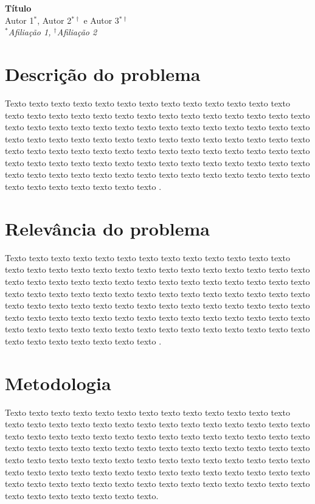 \documentclass[a4paper,10pt,twoside]{article}
\newcommand{\info}[3]{
  \pagebreak
  \begin{center}
    \vspace*{2ex}
    \textbf{\huge #1}\vspace*{2ex}\\
    {\large #2}\vspace*{2ex}\\
    \textit{#3}
    \vspace*{4ex}\\
    \end{center}
    }
\begin{document}
\info{Título}{Autor 1$^*$, Autor 2$^{*\dagger}$ e Autor 3$^{*\dagger}$}{$^{*}$Afiliação 1, $^{\dagger}$Afiliação 2}


\section{Descrição do problema}

Texto texto texto texto texto texto texto texto texto texto texto texto texto texto texto texto texto texto texto texto texto texto texto texto texto texto texto texto texto texto texto texto texto texto texto texto texto texto texto texto texto texto texto texto texto texto texto texto texto texto texto texto texto texto texto texto texto texto texto texto texto texto texto texto texto texto texto texto texto texto texto texto texto texto texto texto texto texto texto texto texto texto texto texto texto texto texto texto texto texto texto texto texto texto texto texto texto texto texto texto texto texto texto texto \citep{ref1,ref2}.

\section{Relevância do problema}

Texto texto texto texto texto texto texto texto texto texto texto texto texto texto texto texto texto texto texto texto texto texto texto texto texto texto texto texto texto texto texto texto texto texto texto texto texto texto texto texto texto texto texto texto texto texto texto texto texto texto texto texto texto texto texto texto texto texto texto texto texto texto texto texto texto texto texto texto texto texto texto texto texto texto texto texto texto texto texto texto texto texto texto texto texto texto texto texto texto texto texto texto texto texto texto texto texto texto texto texto texto texto texto texto \citep{ref3,ref4}.

\section{Metodologia}

Texto texto texto texto texto texto texto texto texto texto texto texto texto texto texto texto texto texto texto texto texto texto texto texto texto texto texto texto texto texto texto texto texto texto texto texto texto texto texto texto texto texto texto texto texto texto texto texto texto texto texto texto texto texto texto texto texto texto texto texto texto texto texto texto texto texto texto texto texto texto texto texto texto texto texto texto texto texto texto texto texto texto texto texto texto texto texto texto texto texto texto texto texto texto texto texto texto texto texto texto texto texto texto texto.
\end{document}

